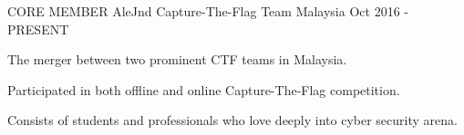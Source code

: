 

\begin{cventries}

    \cventry
    {CORE MEMBER}
    {AleJnd Capture-The-Flag Team}
    {Malaysia}
    {Oct 2016 - PRESENT}
    {
      \begin{cvitems}
        \item {The merger between two prominent CTF teams in Malaysia.}
        \item {Participated in both offline and online Capture-The-Flag competition.}
        \item {Consists of students and professionals who love deeply into cyber security arena.}
      \end{cvitems}
    }
\end{cventries}
